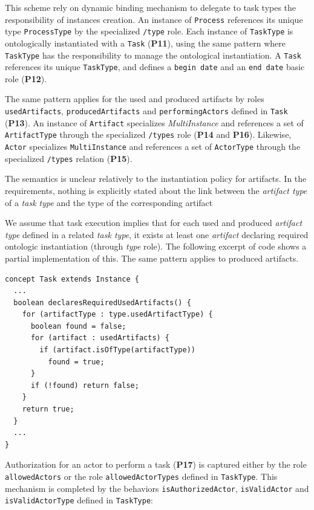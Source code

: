 This scheme rely on \FML dynamic binding mechanism to delegate to task types the responsibility of instances creation. An instance of \texttt{Process} references its unique type \texttt{ProcessType} by the specialized \texttt{/type} role. Each instance of \texttt{TaskType} is ontologically instantiated with a \texttt{Task} (\textbf{P11}), using the same pattern where \texttt{TaskType} has the responsibility to manage the ontological instantiation. A \texttt{Task} references its unique \texttt{TaskType}, and defines a \texttt{begin date} and an \texttt{end date} basic role (\textbf{P12}).

The same pattern applies for the used and produced artifacts by roles \texttt{usedArtifacts}, \texttt{producedArtifacts} and \texttt{performingActors} defined in \texttt{Task} (\textbf{P13}). An instance of \texttt{Artifact} specializes \textit{MultiInstance} and references a set of \texttt{ArtifactType} through the specialized \texttt{/types} role (\textbf{P14} and \textbf{P16}). Likewise, \texttt{Actor} specializes \texttt{MultiInstance} and references a set of \texttt{ActorType} through the specialized \texttt{/types} relation (\textbf{P15}).

The semantics is unclear relatively to the instantiation policy for artifacts. In the requirements, nothing is explicitly stated about the link between the \emph{artifact type} of a \emph{task type} and the type of the corresponding artifact

We assume that task execution implies that for each used and produced \emph{artifact type} defined in a related \emph{task type}, it exists at least one \emph{artifact} declaring required ontologic instantiation (through \textit{type} role). The following excerpt of \FML code shows a partial implementation of this. The same pattern applies to produced artifacts.

\begin{lstlisting}
concept Task extends Instance {
  ...
  boolean declaresRequiredUsedArtifacts() {
    for (artifactType : type.usedArtifactType) {
      boolean found = false;
      for (artifact : usedArtifacts) {
        if (artifact.isOfType(artifactType))
          found = true;
      }
      if (!found) return false;
    }
    return true;
  }
  ...
}    
\end{lstlisting}

Authorization for an actor to perform a task (\textbf{P17}) is captured either by the role \texttt{allowedActors} or the role \texttt{allowedActorTypes} defined in \texttt{TaskType}. This mechanism is completed by the behaviors \texttt{isAuthorizedActor}, \texttt{isValidActor} and \texttt{isValidActorType} defined in \texttt{TaskType}: 

